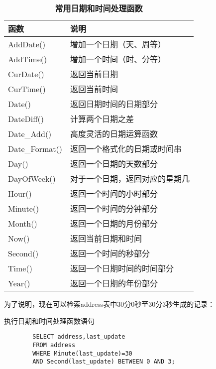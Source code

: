 \documentclass[UTF8]{article}
\begin{document}
\begin{table}[H]
        \caption{\textbf{常用日期和时间处理函数}}%
        \centering%
        \begin{tabular}{ll}%
        \toprule%
        函数&说明\\
        \midrule%
        AddDate()    & 增加一个日期（天、周等） \\ 
        AddTime()    & 增加一个时间（时、分等） \\ 
        CurDate()    & 返回当前日期 \\ 
        CurTime()    & 返回当前时间 \\ 
        Date()       & 返回日期时间的日期部分 \\ 
        DateDiff()   & 计算两个日期之差 \\ 
        Date\_Add()  & 高度灵活的日期运算函数 \\ 
        Date\_Format() & 返回一个格式化的日期或时间串 \\ 
        Day()        & 返回一个日期的天数部分 \\ 
        DayOfWeek()  & 对于一个日期，返回对应的星期几 \\ 
        Hour()       & 返回一个时间的小时部分 \\ 
        Minute()     & 返回一个时间的分钟部分 \\ 
        Month()      & 返回一个日期的月份部分 \\ 
        Now()        & 返回当前日期和时间 \\ 
        Second()     & 返回一个时间的秒部分 \\ 
        Time()       & 返回一个日期时间的时间部分 \\ 
        Year()       & 返回一个日期的年份部分 \\ 
        \bottomrule%
        \end{tabular}
\end{table}  

为了说明，现在可以检索address表中30分0秒至30分3秒生成的记录：

\begin{listing}[H]
	\caption{执行日期和时间处理函数语句}
	\label{code:conductdatetimefunctionclause}
\begin{verbatim}
        SELECT address,last_update 
        FROM address 
        WHERE Minute(last_update)=30 
        AND Second(last_update) BETWEEN 0 AND 3;       
\end{verbatim}
\end{listing}
\end{document}
